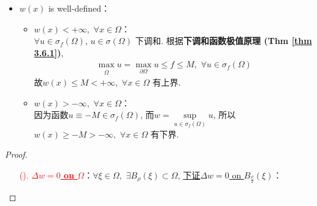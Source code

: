 \begin{thm}
\begin{rmk}
\begin{itemize}
				\vspace*{2em}
				
				\item $w(x)$ is well-defined：
				\begin{itemize}
					\item $w(x) < +\infty , \,\, \forall x \in \Omega$：\\
					$\forall u \in \sigma_f(\Omega)$, $u \in \sigma(\Omega)$ 下调和. 根据\textbf{下调和函数极值原理 (Thm \ref{thm 3.6.1})}, 
					\begin{align*}
						\max_{\overline{\Omega}} u = \max_{\partial \Omega} u \leq f \leq M , \,\, \forall u \in \sigma_{f}(\Omega)
					\end{align*}
					故$w(x) \leq M < +\infty , \,\, \forall x \in \Omega$ 有上界. 
					
					\vspace*{2em}
					
					\item $w(x) > -\infty , \,\, \forall x \in \Omega$：\\
					因为函数$u \equiv -M \in \sigma_{f}(\Omega)$, 而$w = \underset{u \in \sigma_{f}(\Omega)}{\sup} u$, 所以$w(x) \geq -M > -\infty , \,\, \forall x \in \Omega$ 有下界. 
				\end{itemize}
			\end{itemize}
		\end{rmk}
		
		\newpage
		
		\begin{proof}
			\begin{enumerate}
				\item[\textcolor{red}{(\rmnum{1}).}] \textcolor{red}{\underline{\textbf{$\Delta w = 0$ on $\Omega$}}}：$\forall \xi \in \Omega ,$ $\exists B_{\rho}(\xi) \subset \Omega$, \underline{下证$\Delta w = 0$ on $B_{\tfrac{\rho}{2}}(\xi)$}：
				
				\vspace*{1em}
				

\end{enumerate}
\end{proof}
\end{thm}
